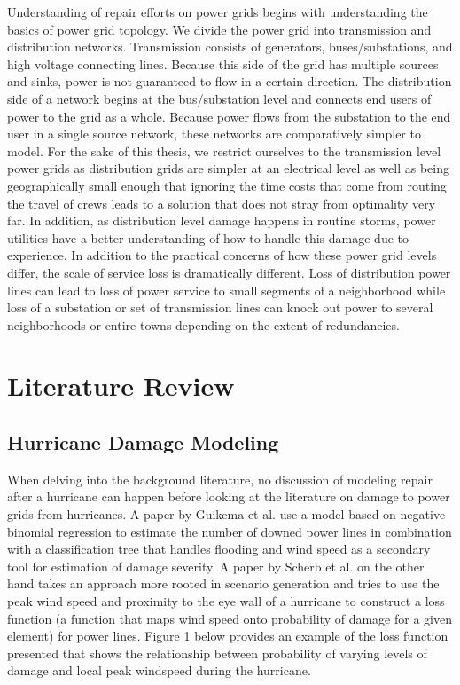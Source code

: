 \documentclass{article}
\begin{document}
	Understanding of repair efforts on power grids begins with understanding the basics of power grid topology. We divide the power grid into transmission and distribution networks. Transmission consists of generators, buses/substations, and high voltage connecting lines. Because this side of the grid has multiple sources and sinks, power is not guaranteed to flow in a certain direction. The distribution side of a network begins at the bus/substation level and connects end users of power to the grid as a whole. Because power flows from the substation to the end user in a single source network, these networks are comparatively simpler to model. For the sake of this thesis, we restrict ourselves to the transmission level power grids as distribution grids are simpler at an electrical level as well as being geographically small enough that ignoring the time costs that come from routing the travel of crews leads to a solution that does not stray from optimality very far. In addition, as distribution level damage happens in routine storms, power utilities have a better understanding of how to handle this damage due to experience. In addition to the practical concerns of how these power grid levels differ, the scale of service loss is dramatically different. Loss of distribution power lines can lead to loss of power service to small segments of a neighborhood while loss of a substation or set of transmission lines can knock out power to several neighborhoods or entire towns depending on the extent of redundancies.
	
	
	\section{Literature Review}
	\subsection{Hurricane Damage Modeling}
		When delving into the background literature, no discussion of modeling repair after a hurricane can happen before looking at the literature on damage to power grids from hurricanes. A paper by Guikema et al. \cite{GuikemaEA2010} use a model based on negative binomial regression to estimate the number of downed power lines in combination with a classification tree that handles flooding and wind speed as a secondary tool for estimation of damage severity. A paper by Scherb et al. \cite{ScherbEA2015} on the other hand takes an approach more rooted in scenario generation and tries to use the peak wind speed and proximity to the eye wall of a hurricane to construct a loss function (a function that maps wind speed onto probability of damage for a given element) for power lines. Figure 1 below provides an example of the loss function presented that shows the relationship between probability of varying levels of damage and local peak windspeed during the hurricane.
		
\end{document}
